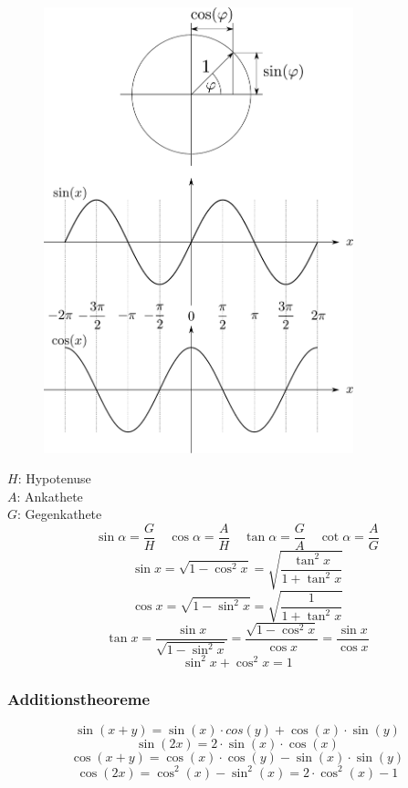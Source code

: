 \begin{figure}[h!]
\centering
\includegraphics[width=0.8\textwidth]{einheitskreis.pdf}
\end{figure}

\noindent
$H$: Hypotenuse\\
$A$: Ankathete\\
$G$: Gegenkathete
\[ \boxed{\sin\alpha=\frac{G}{H}} \quad \boxed{\cos\alpha=\frac{A}{H}} 
\quad \boxed{\tan\alpha=\frac{G}{A}} \quad \boxed{\cot\alpha=\frac{A}{G}} \]
\[ \boxed{\sin x = \sqrt{1-\cos^2x} = \sqrt{\frac{\tan^2x}{1+\tan^2x}}} \]
\[ \boxed{\cos x = \sqrt{1-\sin^2x} = \sqrt{\frac{1}{1+\tan^2x}}} \]
\[ \boxed{\tan x = \frac{\sin x}{\sqrt{1-\sin^2x}} 
= \frac{\sqrt{1-\cos^2x}}{\cos x} = \frac{\sin x}{\cos x}} \]
\[ \boxed{\sin^2 x + \cos^2 x = 1} \]

\subsubsection{Additionstheoreme}
\[ \boxed{\sin(x+y) = \sin(x) \cdot cos(y) + \cos(x) \cdot \sin(y) }\]
\[ \boxed{\sin(2x) = 2 \cdot \sin(x) \cdot \cos(x) }\]
\[ \boxed{\cos(x+y) = \cos(x) \cdot \cos(y) - \sin(x) \cdot \sin(y) }\]
\[ \boxed{\cos(2x) = \cos^2(x) - \sin^2(x) = 2 \cdot \cos^2(x) - 1 }\]


